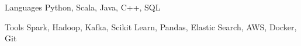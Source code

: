 


\begin{cvskills}


\cvskill
{Languages} %
{Python, Scala, Java, C++, SQL} %


\cvskill
{Tools}
{Spark, Hadoop, Kafka, Scikit Learn, Pandas, Elastic Search, AWS, Docker, Git}




\end{cvskills}
